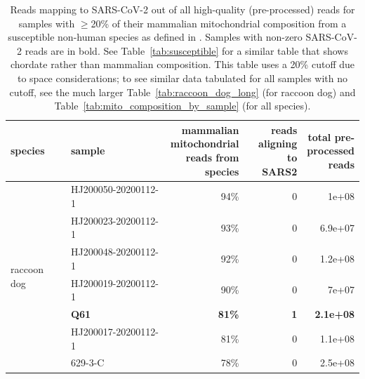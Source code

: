 \documentclass[9pt,twocolumn,twoside]{gsajnl_modified}
\begin{document}
\begin{table}
\caption{
Reads mapping to SARS-CoV-2 out of all high-quality (pre-processed) reads for samples with $\ge$20\% of their mammalian mitochondrial composition from a susceptible non-human species as defined in \citet{crits2023genetic}.
Samples with non-zero SARS-CoV-2 reads are in bold.
See Table~\ref{tab:susceptible} for a similar table that shows chordate rather than mammalian composition.
This table uses a 20\% cutoff due to space considerations; to see similar data tabulated for all samples with no cutoff, see the much larger Table~\ref{tab:raccoon_dog_long} (for raccoon dog) and Table~\ref{tab:mito_composition_by_sample} (for all species).
\label{tab:susceptible_mammal}
}
{\scriptsize
\setlength{\tabcolsep}{5pt}
\renewcommand{\arraystretch}{1.3}
\begin{tabular}{llrrr}
\toprule
species      &   sample              & \makecell[r]{mammalian \\ mitochondrial \\ reads from \\ species} &  \makecell[r]{reads \\ aligning \\ to SARS2} & \makecell[r]{ total pre-\\processed \\ reads} \\ 
\midrule
\multirow{28}{*}{raccoon dog} & HJ200050-20200112-1 &                                       94\% &                        0 &                     1e+08 \\
                  & HJ200023-20200112-1 &                                       93\% &                        0 &                   6.9e+07 \\
                  & HJ200048-20200112-1 &                                       92\% &                        0 &                   1.2e+08 \\
                  & HJ200019-20200112-1 &                                       90\% &                        0 &                     7e+07 \\
                  & {\bf Q61} &                                       {\bf 81\%} &                        {\bf 1} &                   {\bf 2.1e+08} \\
                  & HJ200017-20200112-1 &                                       81\% &                        0 &                   1.1e+08 \\
                  & 629-3-C &                                       78\% &                        0 &                   2.5e+08 \\

\end{tabular}}
\end{table}
\end{document}

